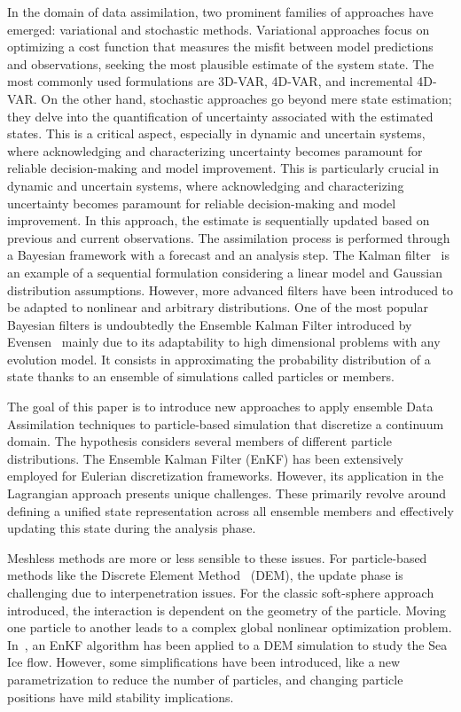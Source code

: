 In the domain of data assimilation, two prominent families of approaches have emerged: variational and stochastic methods. Variational approaches focus on optimizing a cost function that measures the misfit between model predictions and observations, seeking the most plausible estimate of the system state. The most commonly used formulations are 3D-VAR, 4D-VAR, and incremental 4D-VAR.
On the other hand, stochastic approaches go beyond mere state estimation; they delve into the quantification of uncertainty associated with the estimated states. This is a critical aspect, especially in dynamic and uncertain systems, where acknowledging and characterizing uncertainty becomes paramount for reliable decision-making and model improvement. This is particularly crucial in dynamic and uncertain systems, where acknowledging and characterizing uncertainty becomes paramount for reliable decision-making and model improvement. In this approach, the estimate is sequentially updated based on previous and current observations. The assimilation process is performed through a Bayesian framework with a forecast and an analysis step. The Kalman filter~\cite{kalman_new_1960} is an example of a sequential formulation considering a linear model and Gaussian distribution assumptions. However, more advanced filters have been introduced to be adapted to nonlinear and arbitrary distributions. One of the most popular Bayesian filters is undoubtedly the Ensemble Kalman Filter introduced by Evensen~\cite{evensen_sequential_1994} mainly due to its adaptability to high dimensional problems with any evolution model. It consists in approximating the probability distribution of a state thanks to an ensemble of simulations called particles or members. \newline

The goal of this paper is to introduce new approaches to apply ensemble Data Assimilation techniques to particle-based simulation that discretize a continuum domain. The hypothesis considers several members of different particle distributions. The Ensemble Kalman Filter (EnKF) has been extensively employed for Eulerian discretization frameworks. However, its application in the Lagrangian approach presents unique challenges. These primarily revolve around defining a unified state representation across all ensemble members and effectively updating this state during the analysis phase.

Meshless methods are more or less sensible to these issues. For particle-based methods like the Discrete Element Method~\cite{cundall_discrete_1979} (DEM), the update phase is challenging due to interpenetration issues. For the classic soft-sphere approach introduced, the interaction is dependent on the geometry of the particle. Moving one particle to another leads to a complex global nonlinear optimization problem. In~\cite{chen_superfloe_2022}, an EnKF algorithm has been applied to a DEM simulation to study the Sea Ice flow. However, some simplifications have been introduced, like a new parametrization to reduce the number of particles, and changing particle positions have mild stability implications.\newline


